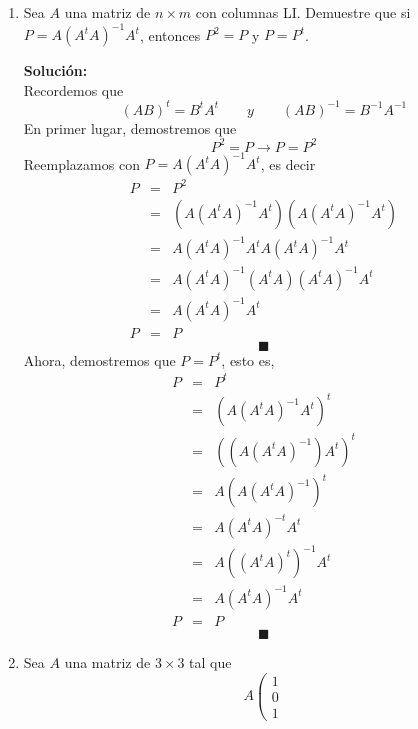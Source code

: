 \documentclass[12pt]{article}
\newenvironment{solucion}
{\begin{mdframed}[backgroundcolor=black!10]
		{\bf Solución:}\\
	}
	{
	\end{mdframed}
}
\newenvironment{preguntas}
{\begin{enumerate}\itemsep12pt
	}
	{
	\end{enumerate}
}
\newcommand{\ra}{\rightarrow}
\begin{document}
\begin{preguntas}
\begin{solucion}
$$\begin{array}{ccc|ccc}
0 & 1 & 0 & 0 & 1 & 0 \\
0 & 0 & 1 &-2 & 0 & 1
\end{array}
\right] \sim
\left[
\begin{array}{ccc|ccc}
1 & 0 & 0 & 1 &-1 & 0 \\
0 & 1 & 0 & 0 & 1 & 0 \\
0 & 0 & 1 &-2 & 0 & 1
\end{array}
\right]
$$
Finalmente,
$$A^{-1} = \begin{bmatrix}
 1 &-1 & 0 \\
 0 & 1 & 0 \\
-2 & 0 & 1
\end{bmatrix}$$
\end{solucion}
\item Sea $A$ una matriz de $n\times m$ con columnas LI. Demuestre que si $P=A(A^tA)^{-1}A^{t}$, entonces $P^2=P$ y $P=P^t$.
\begin{solucion}
	Recordemos que
	$$(AB)^t = B^tA^t \qquad y \qquad (AB)^{-1} = B^{-1}A^{-1}$$
	En primer lugar, demostremos que 
	$$P^2 = P \ra P = P^2$$
	Reemplazamos con $P=A(A^tA)^{-1}A^{t}$, es decir
	$$\begin{array}{rcl}
	P & = & P^2 \\
	  & = & (A(A^tA)^{-1}A^{t})(A(A^tA)^{-1}A^{t}) \\
	  & = & A(A^tA)^{-1}A^{t}A(A^tA)^{-1}A^{t} \\
	  & = & A(A^tA)^{-1}(A^{t}A)(A^tA)^{-1}A^{t} \\
	  & = & A(A^tA)^{-1}A^{t} \\
	P & = & P
	\end{array}$$
	$$\blacksquare$$
	Ahora, demostremos que $P = P^t$, esto es,
	$$\begin{array}{rcl}
	P & = & P^t \\
	  & = & (A(A^tA)^{-1}A^{t})^t \\
	  & = & ((A(A^tA)^{-1})A^{t})^t \\
	  & = & A(A(A^tA)^{-1})^t \\
	  & = & A(A^tA)^{-t}A^t \\
	  & = & A((A^tA)^t)^{-1}A^t \\
	  & = & A(A^tA)^{-1}A^t \\
	P & = & P
	\end{array}$$
	$$\blacksquare$$
\end{solucion}
\item Sea $A$ una matriz de $3\times 3$ tal que
      $$A\left(\begin{array}{r}
  1\\0\\1

\end{array}$$
\end{preguntas}
\end{document}
